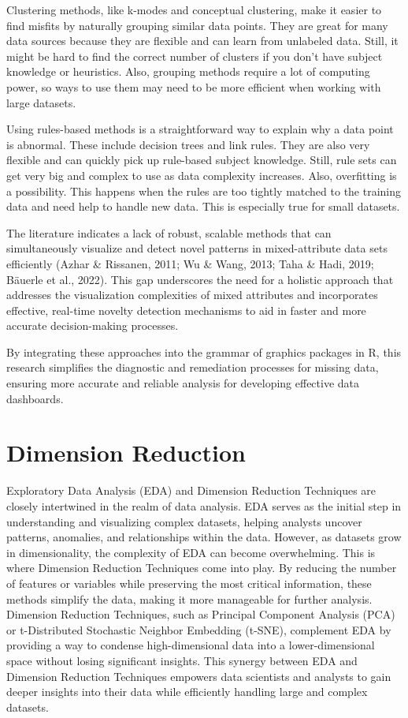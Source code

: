 \documentclass[print]{nuthesis}
\begin{document}
Clustering methods, like k-modes and conceptual clustering, make it easier to find misfits by naturally grouping similar data points.
They are great for many data sources because they are flexible and can learn from unlabeled data.
Still, it might be hard to find the correct number of clusters if you don't have subject knowledge or heuristics.
Also, grouping methods require a lot of computing power, so ways to use them may need to be more efficient when working with large datasets.

Using rules-based methods is a straightforward way to explain why a data point is abnormal.
These include decision trees and link rules. They are also very flexible and can quickly pick up rule-based subject knowledge.
Still, rule sets can get very big and complex to use as data complexity increases.
Also, overfitting is a possibility.
This happens when the rules are too tightly matched to the training data and need help to handle new data. This is especially true for small datasets.

The literature indicates a lack of robust, scalable methods that can simultaneously visualize and detect novel patterns in mixed-attribute data sets efficiently (Azhar \& Rissanen, 2011; Wu \& Wang, 2013; Taha \& Hadi, 2019; Bäuerle et al., 2022).
This gap underscores the need for a holistic approach that addresses the visualization complexities of mixed attributes and incorporates effective, real-time novelty detection mechanisms to aid in faster and more accurate decision-making processes.

By integrating these approaches into the grammar of graphics packages in R, this research simplifies the diagnostic and remediation processes for missing data, ensuring more accurate and reliable analysis for developing effective data dashboards.

\hypertarget{dimension-reduction}{%
\section{Dimension Reduction}\label{dimension-reduction}}

Exploratory Data Analysis (EDA) and Dimension Reduction Techniques are closely intertwined in the realm of data analysis.
EDA serves as the initial step in understanding and visualizing complex datasets, helping analysts uncover patterns, anomalies, and relationships within the data.
However, as datasets grow in dimensionality, the complexity of EDA can become overwhelming. This is where Dimension Reduction Techniques come into play.
By reducing the number of features or variables while preserving the most critical information, these methods simplify the data, making it more manageable for further analysis.
Dimension Reduction Techniques, such as Principal Component Analysis (PCA) or t-Distributed Stochastic Neighbor Embedding (t-SNE), complement EDA by providing a way to condense high-dimensional data into a lower-dimensional space without losing significant insights.
This synergy between EDA and Dimension Reduction Techniques empowers data scientists and analysts to gain deeper insights into their data while efficiently handling large and complex datasets.
\end{document}
